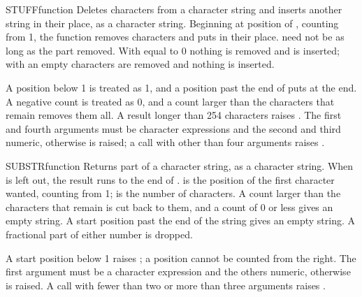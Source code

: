 \begin{XbaseEntry}{STUFF}{function}
Deletes characters from a character string and inserts another string in their place, as a character string.
\Syntax
{}
\Usage
Beginning at position  of , counting from 1, the function removes  characters and puts  in their place.  need not be as long as the part removed. With  equal to 0 nothing is removed and  is inserted; with an empty  characters are removed and nothing is inserted.

A position below 1 is treated as 1, and a position past the end of  puts  at the end. A negative count is treated as 0, and a count larger than the characters that remain removes them all. A result longer than 254 characters raises . The first and fourth arguments must be character expressions and the second and third numeric, otherwise  is raised; a call with other than four arguments raises .
\Examples
{}
\end{XbaseEntry}

\begin{XbaseEntry}{SUBSTR}{function}
Returns part of a character string, as a character string.
\Syntax
{}
\Defaults
When  is left out, the result runs to the end of .
\Usage
{} is the position of the first character wanted, counting from 1;  is the number of characters. A count larger than the characters that remain is cut back to them, and a count of 0 or less gives an empty string. A start position past the end of the string gives an empty string. A fractional part of either number is dropped.

A start position below 1 raises ; a position cannot be counted from the right. The first argument must be a character expression and the others numeric, otherwise  is raised. A call with fewer than two or more than three arguments raises .
\Examples
{}
\end{XbaseEntry}

